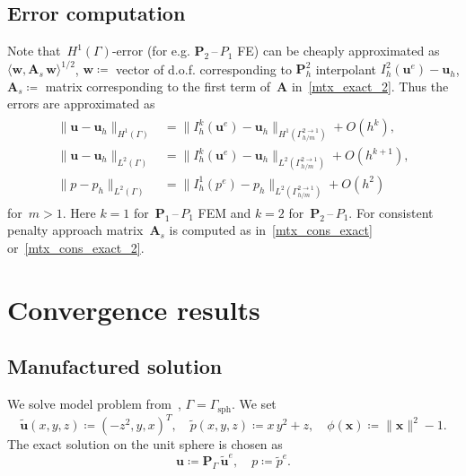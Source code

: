\documentclass[12pt]{article}
\newcommand{\vect}[1]{\boldsymbol{\mathbf{#1}}}
\newcommand{\sphere}{{\Gamma_{\text{sph}}}}
\newcommand{\LTwoSpace}[1][\Gamma]{{L^2\left({#1}\right)}}
\newcommand{\HOneSpace}[1][\Gamma]{{H^1\left({#1}\right)}}
\begin{document}
\subsection{Error computation}

Note that~$\HOneSpace$-error (for e.g. $\vect P_2$\,--\,$P_1$ FE) can be cheaply approximated as~$\langle \vect w, \vect A_s\,\vect w \rangle^{1/2}$, $\vect w \coloneqq$ vector of d.o.f. corresponding to $\vect P^2_h$ interpolant $I_h^2(\vect u^e) - \vect u_h$, $\vect A_s \coloneqq$ matrix corresponding to the first term of~$\vect A$ in~\eqref{mtx_exact_2}. Thus the errors are approximated as
\begin{align}\begin{split}
	\| \vect u - \vect u_h \|_{\HOneSpace} &= \| I^k_h(\vect u^e) - \vect u_h \|_{\HOneSpace[\Gamma_{h/m}^{2 \to 1}]} + O(h^{k}), \\
	\| \vect u - \vect u_h \|_{\LTwoSpace} &= \| I^k_h(\vect u^e) - \vect u_h \|_{\LTwoSpace[\Gamma_{h/m}^{2 \to 1}]} + O(h^{k+1}), \\
	\| p - p_h \|_{\LTwoSpace} &= \| I^1_h(p^e) - p_h \|_{\LTwoSpace[\Gamma_{h/m}^{2 \to 1}]} + O(h^2)
\end{split}\end{align}
for~$m > 1$. Here $k = 1$ for~$\vect P_1$\,--\,$P_1$ FEM and $k = 2$ for~$\vect P_2$\,--\,$P_1$. For consistent penalty approach matrix~$\vect A_s$ is computed as in~\eqref{mtx_cons_exact} or~\eqref{mtx_cons_exact_2}.

\section{Convergence results}\label{sec:conv}

\subsection{Manufactured solution}

We solve model problem from~\cite[p.\,20]{surfstokes}, $\Gamma = \sphere$\footnotemark{}. We set
\begin{equation}\label{exact_soln}
	\tilde{\vect u}(x, y, z) \coloneqq (-z^2, y, x)^T, \quad
	\tilde p(x, y, z) \coloneqq x\,y^2 + z, \quad
	\phi(\vect x) \coloneqq \|\vect x\|^2 - 1.
\end{equation}
The exact solution on the unit sphere is chosen as 
\begin{equation}\label{exact_soln_2}
	\vect u \coloneqq \vect P_\Gamma\,\tilde{\vect u}^e, \quad
	p \coloneqq \tilde p^e.
\end{equation}
\end{document}
